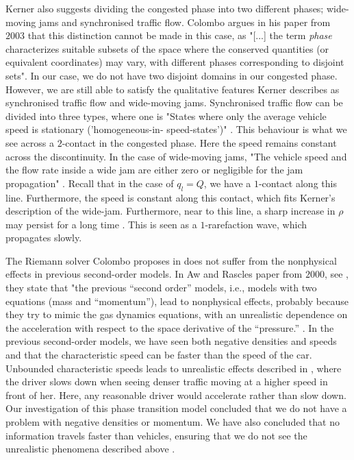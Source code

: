 \documentclass[10pt]{article}
\numberwithin{equation}{section}
\begin{document}
Kerner also suggests dividing the congested phase into two different phases; wide-moving jams and synchronised traffic flow. Colombo argues in his paper from $2003$ that this distinction cannot be made in this case, as "[...] the term \textit{phase} characterizes suitable subsets of the space where the conserved quantities (or equivalent coordinates) may vary, with different phases corresponding to disjoint sets"\cite[p.~717]{Colombo2003}. In our case, we do not have two disjoint domains in our congested phase. However, we are still able to satisfy the qualitative features Kerner describes as synchronised traffic flow and wide-moving jams. Synchronised traffic flow can be divided into three types, where one is "States where only the average vehicle speed is stationary ('homogeneous-in- speed-states')" \cite[p. 260]{KernerHelbing}. This behaviour is what we see across a $2$-contact in the congested phase. Here the speed remains constant across the discontinuity. %
In the case of wide-moving jams, "The vehicle speed and the flow rate inside a wide jam are either zero or negligible for the jam propagation" \cite[p. 265]{KernerHelbing}. Recall that in the case of $q_l = Q$, we have a $1$-contact along this line. Furthermore, the speed is constant along this contact, which fits Kerner's description of the wide-jam. Furthermore, near to this line, a sharp increase in $\rho$ may persist for a long time \cite{Colombo2003}. This is seen as a $1$-rarefaction wave, which propagates slowly.

The Riemann solver Colombo proposes in \cite{Colombo2003} does not suffer from the nonphysical effects in previous second-order models. In  Aw and Rascles paper from $2000$, see \cite{Aw2000ResurrectionO}, they state that  "the previous “second order” models, i.e., models with two equations (mass and “momentum”), lead to nonphysical effects, probably because they try to mimic the gas dynamics equations, with an unrealistic dependence on the acceleration with respect to the space derivative of the “pressure.” \cite[p.~916] {Aw2000ResurrectionO}. In the previous second-order models, we have seen both negative densities and speeds \cite{GaravelloMauro2006Tfon} and that the characteristic speed can be faster than the speed of the car. Unbounded characteristic speeds leads to unrealistic effects described in \cite[p. ~918]{Aw2000ResurrectionO}, where the driver slows down when seeing denser traffic moving at a higher speed in front of her. Here, any reasonable driver would accelerate rather than slow down. Our investigation of this phase transition model concluded that we do not have a problem with negative densities or momentum. We have also concluded that no information travels faster than vehicles, ensuring that we do not see the unrealistic phenomena described above \cite{Aw2000ResurrectionO}.
\end{document}
